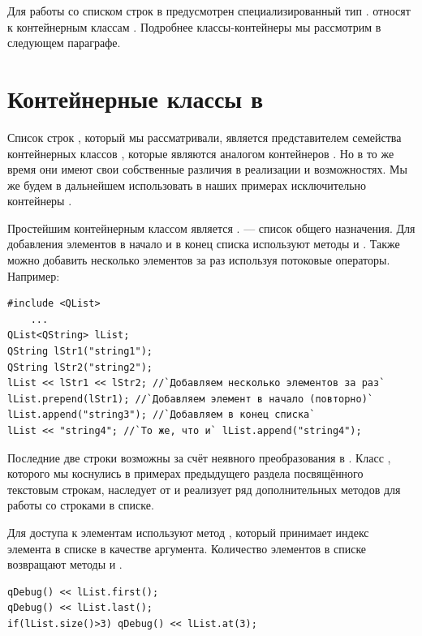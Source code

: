Для работы со списком строк в  предусмотрен специализированный тип
.   относят к контейнерным классам .
Подробнее классы-контейнеры мы рассмотрим в следующем параграфе.

\section[Контейнерные классы в \Sys{Qt}]{Контейнерные классы в }

Список строк , который мы рассматривали, является представителем
семейства контейнерных классов , которые являются
аналогом контейнеров . Но в то же время они имеют свои собственные различия в 
реализации и возможностях. Мы же будем
в дальнейшем использовать в наших примерах исключительно контейнеры .

Простейшим контейнерным классом является . 
 --- список общего назначения. Для добавления элементов в начало и в конец списка используют методы
 и . Также можно добавить несколько элементов за раз
используя потоковые операторы. Например:
\begin{lstlisting}
#include <QList>
    ...
QList<QString> lList;
QString lStr1("string1");
QString lStr2("string2");
lList << lStr1 << lStr2; //`Добавляем несколько элементов за раз`
lList.prepend(lStr1); //`Добавляем элемент в начало (повторно)` 
lList.append("string3"); //`Добавляем в конец списка`
lList << "string4";	//`То же, что и` lList.append("string4");
\end{lstlisting}

Последние две строки возможны за счёт неявного преобразования  в
. Класс , которого мы коснулись в примерах
предыдущего раздела посвящённого текстовым строкам, наследует от 
и реализует ряд дополнительных методов для работы со строками в списке.

Для доступа к элементам используют метод , который принимает индекс элемента в
списке в качестве аргумента. Количество элементов в списке возвращают методы  и
.
\begin{lstlisting}
qDebug() << lList.first();
qDebug() << lList.last();
if(lList.size()>3) qDebug() << lList.at(3);
\end{lstlisting}


